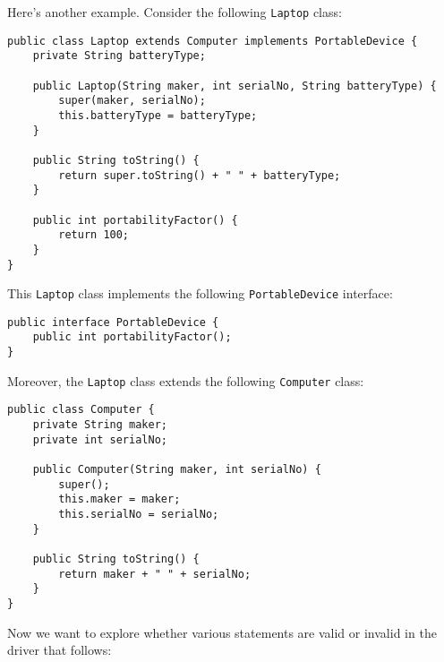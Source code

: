 Here's another example. Consider the following \verb!Laptop! class:

\begin{lstlisting}
public class Laptop extends Computer implements PortableDevice {
	private String batteryType;
	
	public Laptop(String maker, int serialNo, String batteryType) {
		super(maker, serialNo);
		this.batteryType = batteryType;
	}

	public String toString() {
		return super.toString() + " " + batteryType;
	}
	
	public int portabilityFactor() {
		return 100;
	}
}
\end{lstlisting}

This \verb!Laptop! class implements the following \verb!PortableDevice! interface:

\begin{lstlisting}
public interface PortableDevice {
	public int portabilityFactor();
}
\end{lstlisting}

Moreover, the \verb!Laptop! class extends the following \verb!Computer! class:

\begin{lstlisting}
public class Computer {
	private String maker;
	private int serialNo;
	
	public Computer(String maker, int serialNo) {
		super();
		this.maker = maker;
		this.serialNo = serialNo;
	}
	
	public String toString() {
		return maker + " " + serialNo;
	}
}
\end{lstlisting}

Now we want to explore whether various statements are valid or invalid in the driver that follows:

